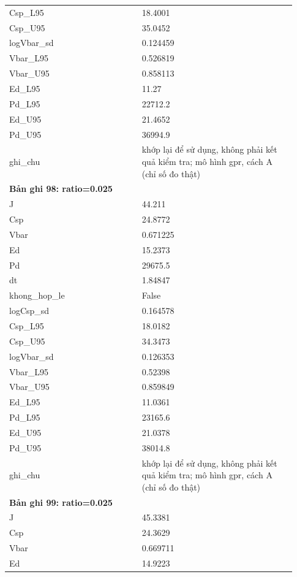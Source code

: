 \begin{longtable}{p{0.43\linewidth}p{0.50\linewidth}}
Csp\_\allowbreak L95 & 18.4001 \\
Csp\_\allowbreak U95 & 35.0452 \\
logVbar\_\allowbreak sd & 0.124459 \\
Vbar\_\allowbreak L95 & 0.526819 \\
Vbar\_\allowbreak U95 & 0.858113 \\
Ed\_\allowbreak L95 & 11.27 \\
Pd\_\allowbreak L95 & 22712.2 \\
Ed\_\allowbreak U95 & 21.4652 \\
Pd\_\allowbreak U95 & 36994.9 \\
ghi\_\allowbreak chu & khớp lại để sử dụng, không phải kết quả kiểm tra; mô hình gpr, cách A (chỉ số đo thật) \\
\midrule
\multicolumn{2}{p{0.95\linewidth}}{\textbf{Bản ghi 98: ratio=0.025}} \\
J & 44.211 \\
Csp & 24.8772 \\
Vbar & 0.671225 \\
Ed & 15.2373 \\
Pd & 29675.5 \\
dt & 1.84847 \\
khong\_\allowbreak hop\_\allowbreak le & False \\
logCsp\_\allowbreak sd & 0.164578 \\
Csp\_\allowbreak L95 & 18.0182 \\
Csp\_\allowbreak U95 & 34.3473 \\
logVbar\_\allowbreak sd & 0.126353 \\
Vbar\_\allowbreak L95 & 0.52398 \\
Vbar\_\allowbreak U95 & 0.859849 \\
Ed\_\allowbreak L95 & 11.0361 \\
Pd\_\allowbreak L95 & 23165.6 \\
Ed\_\allowbreak U95 & 21.0378 \\
Pd\_\allowbreak U95 & 38014.8 \\
ghi\_\allowbreak chu & khớp lại để sử dụng, không phải kết quả kiểm tra; mô hình gpr, cách A (chỉ số đo thật) \\
\midrule
\multicolumn{2}{p{0.95\linewidth}}{\textbf{Bản ghi 99: ratio=0.025}} \\
J & 45.3381 \\
Csp & 24.3629 \\
Vbar & 0.669711 \\
Ed & 14.9223 \\

\end{longtable}
